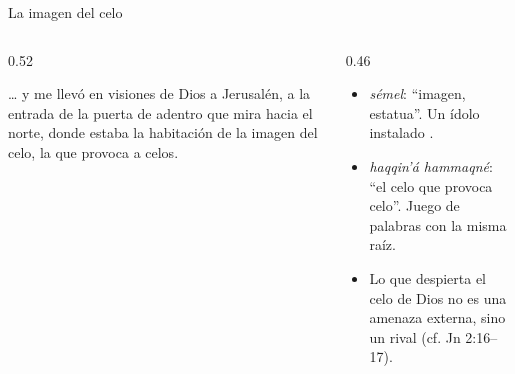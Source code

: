 \begin{frame}{La imagen del celo}
\begin{columns}[c,onlytextwidth]
\begin{column}{0.52\textwidth}
\begin{cita}\ldots{} y me llevó en visiones de Dios a Jerusalén, a la entrada de la puerta de adentro que mira hacia el norte, donde estaba la habitación de la imagen del celo, la que provoca a celos.\end{cita}
\begin{center}\end{center}
\end{column}
\begin{column}{0.46\textwidth}\small
\begin{itemize}
\item {} \emph{sémel}: ``imagen, estatua''. Un ídolo instalado .
\item \emph{haqqin'á hammaqné}: ``el celo que provoca celo''. Juego de palabras con la misma raíz.
\item Lo que despierta el celo de Dios no es una amenaza externa, sino un rival  (cf. Jn 2:16--17).
\end{itemize}
\end{column}
\end{columns}
\end{frame}

